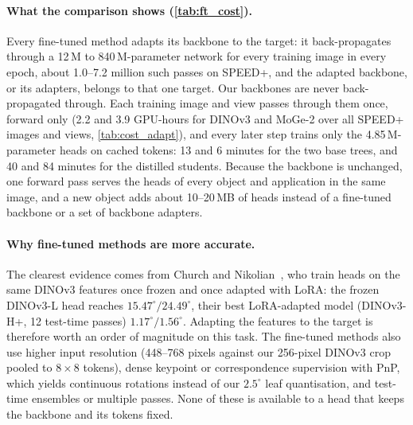 \paragraph{What the comparison shows (\cref{tab:ft_cost}).} Every fine-tuned method adapts its backbone to the target: it back-propagates through a 12\,M to 840\,M-parameter network for every training image in every epoch, about 1.0--7.2 million such passes on SPEED+, and the adapted backbone, or its adapters, belongs to that one target. Our backbones are never back-propagated through. Each training image and view passes through them once, forward only (2.2 and 3.9 GPU-hours for DINOv3 and MoGe-2 over all SPEED+ images and views, \cref{tab:cost_adapt}), and every later step trains only the 4.85\,M-parameter heads on cached tokens: 13 and 6 minutes for the two base trees, and 40 and 84 minutes for the distilled students. Because the backbone is unchanged, one forward pass serves the heads of every object and application in the same image, and a new object adds about 10--20\,MB of heads instead of a fine-tuned backbone or a set of backbone adapters.

\paragraph{Why fine-tuned methods are more accurate.} The clearest evidence comes from Church and Nikolian~\cite{church2026vfm}, who train heads on the same DINOv3 features once frozen and once adapted with LoRA: the frozen DINOv3-L head reaches $15.47^\circ/24.49^\circ$, their best LoRA-adapted model (DINOv3-H+, 12 test-time passes) $1.17^\circ/1.56^\circ$. Adapting the features to the target is therefore worth an order of magnitude on this task. The fine-tuned methods also use higher input resolution (448--768 pixels against our 256-pixel DINOv3 crop pooled to $8\times8$ tokens), dense keypoint or correspondence supervision with PnP, which yields continuous rotations instead of our $2.5^\circ$ leaf quantisation, and test-time ensembles or multiple passes. None of these is available to a head that keeps the backbone and its tokens fixed.

